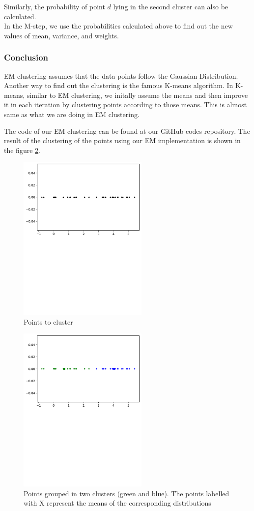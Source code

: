 \documentclass[journal, compsoc]{IEEEtran}
\begin{document}
Similarly, the probability of point $d$ lying in the second cluster can also be calculated.\\

In the M-step, we use the probabilities calculated above to find out the new values of mean, variance, and weights.

\subsubsection{Conclusion}
EM clustering assumes that the data points follow the Gaussian Distribution. Another way to find out the clustering is the famous K-means algorithm.
In K-means, similar to EM clustering, we initally assume the means and then improve it in each iteration by clustering points according to those means.
This is almost same as what we are doing in EM clustering.

The code of our EM clustering can be found at our GitHub codes repository. The result of the clustering of the points using our EM implementation
is shown in the figure \ref{fig:cluster}.
\begin{figure}[!h]
\centering
\includegraphics[width=2.5in]{images/points.pdf}
\caption{Points to cluster}
\label{fig:cluster}
\end{figure}
\begin{figure}[!h]
\centering
\includegraphics[width=2.5in]{images/clustered_points.pdf}
\caption{Points grouped in two clusters (green and blue). The points labelled with X represent the means of the corresponding distributions}
\label{fig:cluster}
\end{figure}
\end{document}
